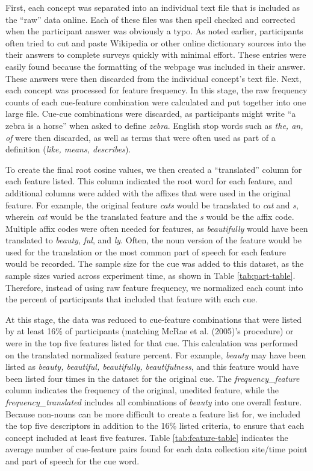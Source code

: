 \documentclass[english,man]{apa6}
\theoremstyle{definition}
\theoremstyle{definition}
\theoremstyle{definition}
\theoremstyle{remark}
\begin{document}
First, each concept was separated into an individual text file that is
included as the \enquote{raw} data online. Each of these files was then
spell checked and corrected when the participant answer was obviously a
typo. As noted earlier, participants often tried to cut and paste
Wikipedia or other online dictionary sources into the their answers to
complete surveys quickly with minimal effort. These entries were easily
found because the formatting of the webpage was included in their
answer. These answers were then discarded from the individual concept's
text file. Next, each concept was processed for feature frequency. In
this stage, the raw frequency counts of each cue-feature combination
were calculated and put together into one large file. Cue-cue
combinations were discarded, as participants might write \enquote{a
zebra is a horse} when asked to define \emph{zebra}. English stop words
such as \emph{the, an, of} were then discarded, as well as terms that
were often used as part of a definition (\emph{like, means, describes}).

To create the final root cosine values, we then created a
\enquote{translated} column for each feature listed. This column
indicated the root word for each feature, and additional columns were
added with the affixes that were used in the original feature. For
example, the original feature \emph{cats} would be translated to
\emph{cat} and \emph{s}, wherein \emph{cat} would be the translated
feature and the \emph{s} would be the affix code. Multiple affix codes
were often needed for features, as \emph{beautifully} would have been
translated to \emph{beauty}, \emph{ful}, and \emph{ly}. Often, the noun
version of the feature would be used for the translation or the most
common part of speech for each feature would be recorded. The sample
size for the cue was added to this dataset, as the sample sizes varied
across experiment time, as shown in Table \ref{tab:part-table}.
Therefore, instead of using raw feature frequency, we normalized each
count into the percent of participants that included that feature with
each cue.

At this stage, the data was reduced to cue-feature combinations that
were listed by at least 16\% of participants (matching McRae et al.
(2005)'s procedure) or were in the top five features listed for that
cue. This calculation was performed on the translated normalized feature
percent. For example, \emph{beauty} may have been listed as
\emph{beauty, beautiful, beautifully, beautifulness}, and this feature
would have been listed four times in the dataset for the original cue.
The \emph{frequency\_feature} column indicates the frequency of the
original, unedited feature, while the \emph{frequency\_translated}
includes all combinations of \emph{beauty} into one overall feature.
Because non-nouns can be more difficult to create a feature list for, we
included the top five descriptors in addition to the 16\% listed
criteria, to ensure that each concept included at least five features.
Table \ref{tab:feature-table} indicates the average number of
cue-feature pairs found for each data collection site/time point and
part of speech for the cue word.
\end{document}

